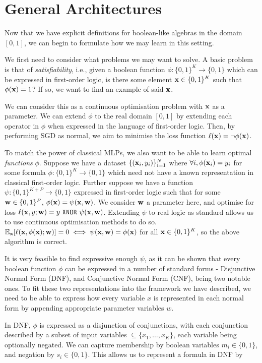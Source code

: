 \section{General Architectures}

Now that we have explicit definitions for boolean-like algebras in the domain $[0,1]$, we can begin to formulate how we may learn in this setting.

We first need to consider what problems we may want to solve. A basic problem is that of \textit{satisfiability}, i.e., given a boolean function $\phi : \{0,1\}^K \rightarrow \{0,1\}$ which can be expressed in first-order logic, is there some element $\mathbf{x} \in \{0,1\}^K$ such that $\phi(\mathbf{x}) = 1$? If so, we want to find an example of said $\mathbf{x}$.

We can consider this as a continuous optimisation problem with $\mathbf{x}$ as a parameter. We can extend $\phi$ to the real domain $[0,1]$ by extending each operator in $\phi$ when expressed in the language of first-order logic. Then, by performing SGD as normal, we aim to minimise the loss function $\ell(\mathbf{x}) = \lnot\phi(\mathbf{x})$.

To match the power of classical MLPs, we also want to be able to learn optimal \textit{functions} $\phi$. Suppose we have a dataset $\{(\mathbf{x}_i, y_i)\}_{i=1}^N$ where $\forall i, \phi(\mathbf{x}_i) = y_i$ for some formula $\phi : \{0,1\}^K  \rightarrow \{0,1\}$ which need not have a known representation in classical first-order logic. Further suppose we have a function $\psi : \{0,1\}^{K+P} \rightarrow \{0,1\}$ expressed in first-order logic such that for some $\mathbf{w} \in \{0,1\}^P$, $\phi(\mathbf{x}) = \psi(\mathbf{x}, \mathbf{w})$. We consider $\mathbf{w}$ a parameter here, and optimise for loss $\ell(\mathbf{x}, y; \mathbf{w}) = y \ \texttt{XNOR}\  \psi(\mathbf{x}, \mathbf{w})$. Extending $\psi$ to real logic as standard allows us to use continuous optimisation methods to do so. $\mathbb{E}_{\mathbf{x}}[\ell(\mathbf{x}, \phi(\mathbf{x}); \mathbf{w})] = 0 \iff \psi(\mathbf{x}, \mathbf{w}) = \phi(\mathbf{x})$ for all $\mathbf{x} \in \{0,1\}^K$, so the above algorithm is correct.

It is very feasible to find expressive enough $\psi$, as it can be shown that every boolean function $\phi$ can be expressed in a number of standard forms - Disjunctive Normal Form (DNF), and Conjunctive Normal Form (CNF), being two notable ones. To fit these two representations into the framework we have described, we need to be able to express how every variable $x$ is represented in each normal form by appending appropriate parameter variables $w$.

In DNF, $\phi$ is expressed as a disjunction of conjunctions, with each conjunction described by a subset of input variables $\subseteq \{x_1,\dots,x_K\}$, each variable being optionally negated. We can capture membership by boolean variables $m_i \in \{0,1\}$, and negation by $s_i \in \{0,1\}$. This allows us to represent a formula in DNF by

